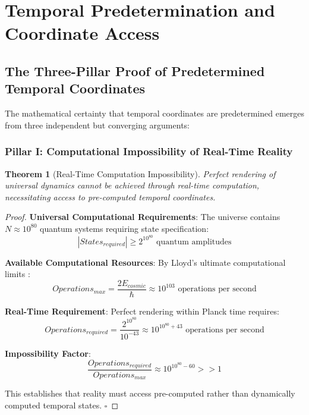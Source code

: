 \documentclass[11pt,a4paper]{article}
\newtheorem{theorem}{Theorem}[section]
\theoremstyle{remark}
\begin{document}
\section{Temporal Predetermination and Coordinate Access}

\subsection{The Three-Pillar Proof of Predetermined Temporal Coordinates}

The mathematical certainty that temporal coordinates are predetermined emerges from three independent but converging arguments:

\subsubsection{Pillar I: Computational Impossibility of Real-Time Reality}

\begin{theorem}[Real-Time Computation Impossibility]
Perfect rendering of universal dynamics cannot be achieved through real-time computation, necessitating access to pre-computed temporal coordinates.
\end{theorem}

\begin{proof}
\textbf{Universal Computational Requirements}: The universe contains $N \approx 10^{80}$ quantum systems requiring state specification:
\begin{equation}
|States_{required}| \geq 2^{10^{80}} \text{ quantum amplitudes}
\end{equation}

\textbf{Available Computational Resources}: By Lloyd's ultimate computational limits \cite{lloyd2000ultimate}:
\begin{equation}
Operations_{max} = \frac{2E_{cosmic}}{\hbar} \approx 10^{103} \text{ operations per second}
\end{equation}

\textbf{Real-Time Requirement}: Perfect rendering within Planck time requires:
\begin{equation}
Operations_{required} = \frac{2^{10^{80}}}{10^{-43}} \approx 10^{10^{80}+43} \text{ operations per second}
\end{equation}

\textbf{Impossibility Factor}:
\begin{equation}
\frac{Operations_{required}}{Operations_{max}} \approx 10^{10^{80}-60} >> 1
\end{equation}

This establishes that reality must access pre-computed rather than dynamically computed temporal states. $\square$
\end{proof}
\end{document}
